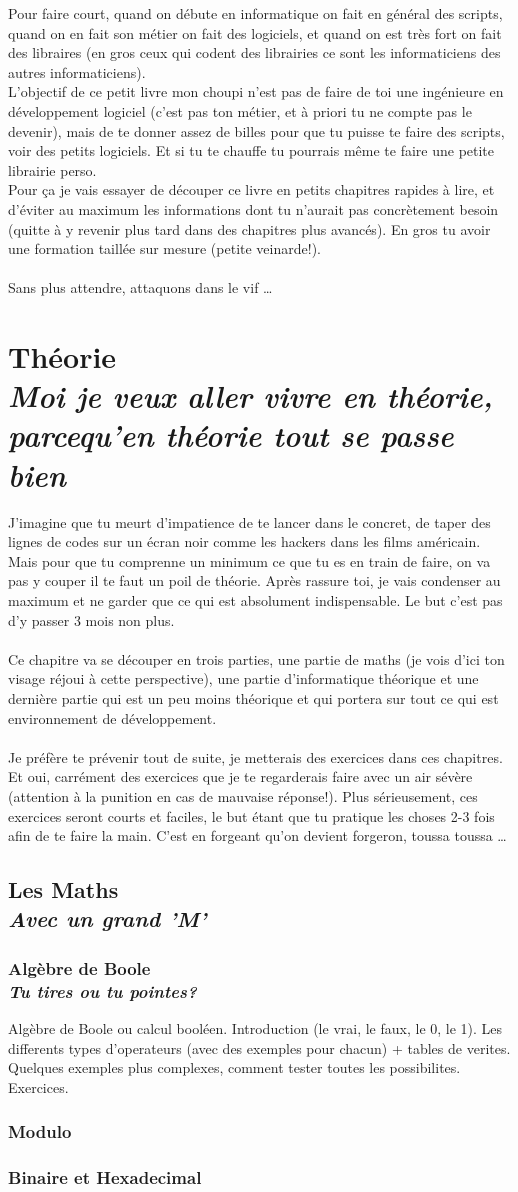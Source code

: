 \documentclass[a4paper, 11pt, oneside, draft]{book}
\newcommand\Chapter[2]{
	\chapter[#1]{#1\\[2ex]\Large\itshape#2}
}
\newcommand\Section[2]{
	\section[#1]{#1\\[1ex]\large\itshape#2}
}
\newcommand\Subsection[2]{
	\subsection[#1]{#1\\[1ex]\normalsize\itshape#2}
}
\begin{document}
\vspace{5mm}
Pour faire court, quand on d\'ebute en informatique on fait en g\'en\'eral des scripts, quand on en fait son m\'etier on fait des logiciels, et quand on est tr\`es fort on fait des libraires (en gros ceux qui codent des librairies ce sont les informaticiens des autres informaticiens).\\
L'objectif de ce petit livre mon choupi n'est pas de faire de toi une ing\'enieure en d\'eveloppement logiciel (c'est pas ton m\'etier, et \`a priori tu ne compte pas le devenir), mais de te donner assez de billes pour que tu puisse te faire des scripts, voir des petits logiciels. Et si tu te chauffe tu pourrais m\^eme te faire une petite librairie perso.\\
Pour \c ca je vais essayer de d\'ecouper ce livre en petits chapitres rapides \`a lire, et d'\'eviter au maximum les informations dont tu n'aurait pas concr\`etement besoin (quitte \`a y revenir plus tard dans des chapitres plus avanc\'es). En gros tu avoir une formation taill\'ee sur mesure (petite veinarde!).\\
\\
Sans plus attendre, attaquons dans le vif \dots

\mainmatter

\Chapter{Th\'eorie}{Moi je veux aller vivre en th\'eorie, parcequ'en th\'eorie tout se passe bien}
J'imagine que tu meurt d'impatience de te lancer dans le concret, de taper des lignes de codes sur un \'ecran noir comme les hackers dans les films am\'ericain.
Mais pour que tu comprenne un minimum ce que tu es en train de faire, on va pas y couper il te faut un poil de th\'eorie.
Apr\`es rassure toi, je vais condenser au maximum et ne garder que ce qui est absolument indispensable. Le but c'est pas d'y passer 3 mois non plus.\\
\\
Ce chapitre va se d\'ecouper en trois parties, une partie de maths (je vois d'ici ton visage r\'ejoui \`a cette perspective), une partie
d'informatique th\'eorique et une derni\`ere partie qui est un peu moins th\'eorique et qui portera sur tout ce qui est environnement
de d\'eveloppement.\\
\\
Je pr\'ef\`ere te pr\'evenir tout de suite, je metterais des exercices dans ces chapitres. Et oui, carr\'ement des exercices que je te regarderais
faire avec un air s\'ev\`ere (attention \`a la punition en cas de mauvaise r\'eponse!). Plus s\'erieusement, ces exercices seront courts
et faciles, le but \'etant que tu pratique les choses 2-3 fois afin de te faire la main. C'est en forgeant qu'on devient forgeron, toussa toussa \dots
\newpage
\Section{Les Maths}{Avec un grand 'M'}
\lipsum[3]
\Subsection{Alg\`ebre de Boole}{Tu tires ou tu pointes?}
Alg\`ebre de Boole ou calcul bool\'een.
Introduction (le vrai, le faux, le 0, le 1).
Les differents types d'operateurs (avec des exemples pour chacun) + tables de verites.
Quelques exemples plus complexes, comment tester toutes les possibilites.
Exercices.

\Subsection{Modulo}{}
\lipsum[3]

\Subsection{Binaire et Hexadecimal}{}
\lipsum[3]

\backmatter

\tableofcontents
\end{document}
